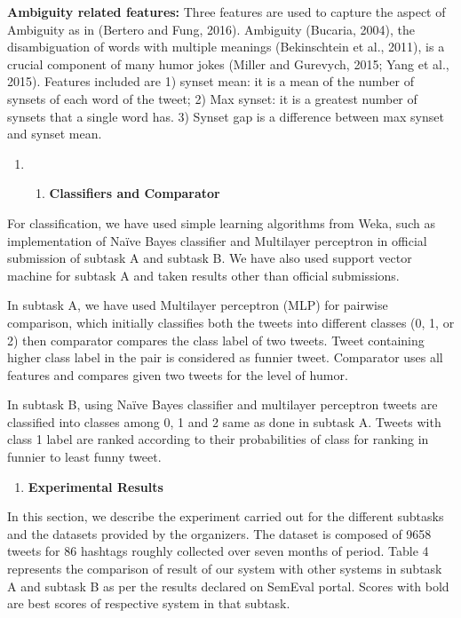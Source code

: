 \documentclass{article} %
\begin{document}
\textbf{Ambiguity related features: }Three features are used to capture the aspect of Ambiguity as in (Bertero and Fung, 2016). Ambiguity (Bucaria, 2004), the disambiguation of words with multiple meanings (Bekinschtein et al., 2011), is a crucial component of many humor jokes (Miller and Gurevych, 2015; Yang et al., 2015). Features included are 1) synset mean: it is a mean of the number of synsets of each word of the tweet; 2) Max synset: it is a greatest number of synsets that a single word has. 3) Synset gap is a difference between max synset and synset mean.

\begin{enumerate}
\item \begin{enumerate}
\item  \textbf{Classifiers and Comparator}
\end{enumerate}
\end{enumerate}

For classification, we have used simple learning algorithms from Weka, such as implementation of Na\"{i}ve Bayes classifier and Multilayer perceptron in official submission of subtask A and subtask B. We have also used support vector machine for subtask A and taken results other than official submissions. 

In subtask A, we have used Multilayer perceptron (MLP) for pairwise comparison, which initially classifies both the tweets into different classes (0, 1, or 2) then comparator compares the class label of two tweets. Tweet containing higher class label in the pair is considered as funnier tweet. Comparator uses all features and compares given two tweets for the level of humor.

In subtask B, using Na\"{i}ve Bayes classifier and multilayer perceptron tweets are classified into classes among 0, 1 and 2 same as done in subtask A. Tweets with class 1 label are ranked according to their probabilities of class for ranking in funnier to least funny tweet. 

\begin{enumerate}
\item  \textbf{Experimental Results}
\end{enumerate}

\noindent In this section, we describe the experiment carried out for the different subtasks and the datasets provided by the organizers. The dataset is composed of 9658 tweets for 86 hashtags roughly collected over seven months of period. Table 4 represents the comparison of result of our system with other systems in subtask A and subtask B as per the results declared on SemEval portal. Scores with bold are best scores of respective system in that subtask.
\end{document}
